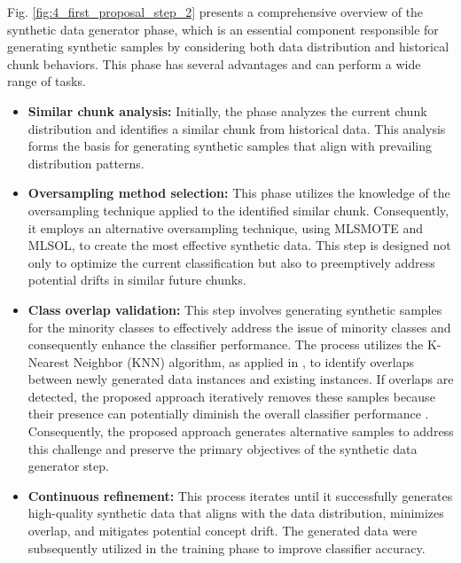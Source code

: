 Fig. \ref{fig:4_first_proposal_step_2} presents a comprehensive overview of the synthetic data generator phase, which is an essential component responsible for generating synthetic samples by considering both data distribution and historical chunk behaviors. This phase has several advantages and can perform a wide range of tasks.
\begin{itemize}
	\item \textbf{Similar chunk analysis:} Initially, the phase analyzes the current chunk distribution and identifies a similar chunk from historical data. This analysis forms the basis for generating synthetic samples that align with prevailing distribution patterns.
	\item \textbf{Oversampling method selection:} This phase utilizes the knowledge of the oversampling technique applied to the identified similar chunk. Consequently, it employs an alternative oversampling technique, using MLSMOTE and MLSOL, to create the most effective synthetic data. This step is designed not only to optimize the current classification but also to preemptively address potential drifts in similar future chunks.
	\item \textbf{Class overlap validation:} This step involves generating synthetic samples for the minority classes to effectively address the issue of minority classes and consequently enhance the classifier performance. The process utilizes the K-Nearest Neighbor (KNN) algorithm, as applied in \cite{lu2016concept}, to identify overlaps between newly generated data instances and existing instances. If overlaps are detected, the proposed approach iteratively removes these samples because their presence can potentially diminish the overall classifier performance \cite{cruz2017meta}\cite{widmer1996learning}. Consequently, the proposed approach generates alternative samples to address this challenge and preserve the primary objectives of the synthetic data generator step.
	\item \textbf{Continuous refinement:} This process iterates until it successfully generates high-quality synthetic data that aligns with the data distribution, minimizes overlap, and mitigates potential concept drift. The generated data were subsequently utilized in the training phase to improve classifier accuracy.
\end{itemize}

